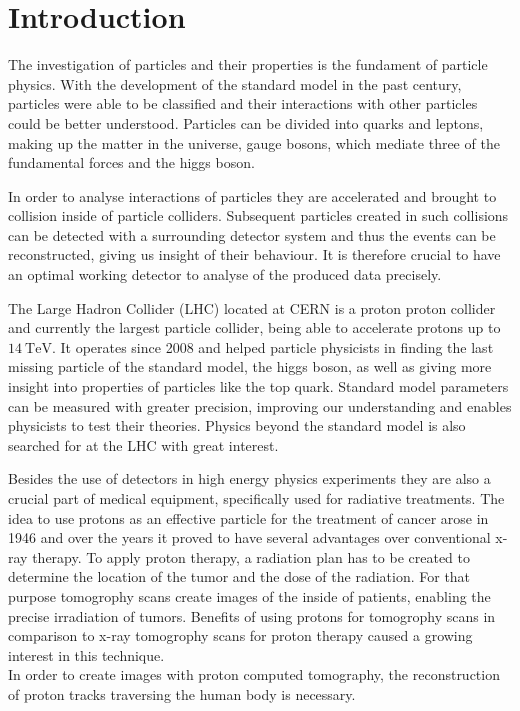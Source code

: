 \chapter{Introduction}
The investigation of particles and their properties is the fundament of particle physics. With the development of the standard model in the past century, particles were able to
be classified and their interactions with other particles could be better understood. Particles can be divided into quarks and leptons, making up the matter in the universe,
gauge bosons, which mediate three of the fundamental forces and the higgs boson.

In order to analyse interactions of particles they are accelerated and brought to collision inside of particle colliders. Subsequent particles created in such collisions
can be detected with a surrounding detector system and thus the events can be reconstructed, giving us insight of their behaviour. It is therefore crucial to have
an optimal working detector to analyse of the produced data precisely.

The Large Hadron Collider (LHC) located at CERN is a proton proton collider and currently the largest particle collider, being able to accelerate protons up to $\SI{14}{\tera\eV}$.
It operates since 2008 and helped particle physicists in finding the last missing particle of the standard model, the higgs boson, as well as giving more insight
into properties of particles like the top quark. Standard model parameters can be measured with greater precision, improving our understanding and enables physicists to
test their theories. Physics beyond the standard model is also searched for at the LHC with great interest.

Besides the use of detectors in high energy physics experiments they are also a crucial part of medical equipment, specifically used for radiative treatments.
The idea to use protons as an effective particle for the treatment of cancer arose in 1946 and over the years it proved to have several advantages over
conventional x-ray therapy. To apply proton therapy, a radiation plan has to be created to determine the location of the tumor and the dose of the radiation.
For that purpose tomogrophy scans create images of the inside of patients, enabling the precise irradiation of tumors.
Benefits of using protons for tomogrophy scans in comparison to x-ray tomogrophy scans for proton therapy caused a growing interest in this technique. \\
In order to create images with proton computed tomography, the reconstruction of proton tracks traversing the human body is necessary.

